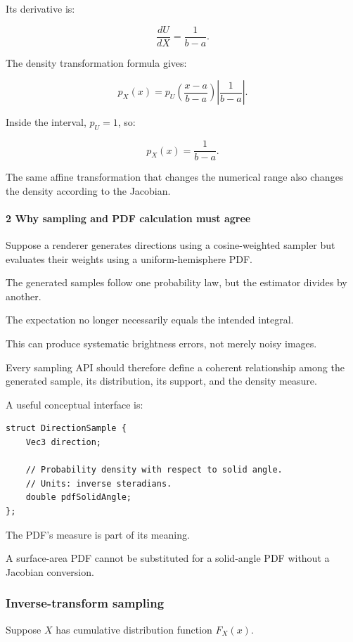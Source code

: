 Its derivative is:

\[
 \frac{dU}{dX}=\frac1{b-a}.
\]

The density transformation formula gives:

\[
 p_X(x)= p_U\left(\frac{x-a}{b-a}\right) \left|\frac1{b-a}\right|.
\]

Inside the interval, \(p_U=1\), so:

\[
 \boxed{p_X(x)=\frac1{b-a}}.
\]

The same affine transformation that changes the numerical range also changes the density according to the Jacobian.

\paragraph{2 Why sampling and PDF calculation must agree}\label{why-sampling-and-pdf-calculation-must-agree}

Suppose a renderer generates directions using a cosine-weighted sampler but evaluates their weights using a uniform-hemisphere PDF.

The generated samples follow one probability law, but the estimator divides by another.

The expectation no longer necessarily equals the intended integral.

This can produce systematic brightness errors, not merely noisy images.

Every sampling API should therefore define a coherent relationship among the generated sample, its distribution, its support, and the density measure.

A useful conceptual interface is:

\begin{verbatim}
struct DirectionSample {
    Vec3 direction;

    // Probability density with respect to solid angle.
    // Units: inverse steradians.
    double pdfSolidAngle;
};
\end{verbatim}

The PDF's measure is part of its meaning.

A surface-area PDF cannot be substituted for a solid-angle PDF without a Jacobian conversion.

\subsubsection{Inverse-transform sampling}\label{inverse-transform-sampling}

Suppose \(X\) has cumulative distribution function \(F_X(x)\).

